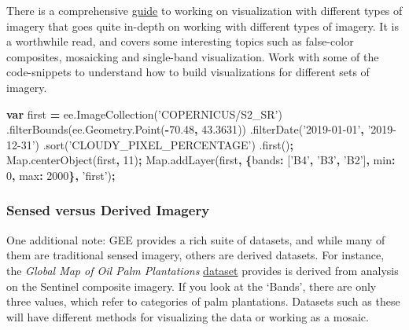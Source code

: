 \documentclass[
]{article}
\newenvironment{Shaded}{\begin{snugshade}}{\end{snugshade}}
\newcommand{\AttributeTok}[1]{\textcolor[rgb]{0.77,0.63,0.00}{#1}}
\newcommand{\DataTypeTok}[1]{\textcolor[rgb]{0.13,0.29,0.53}{#1}}
\newcommand{\DecValTok}[1]{\textcolor[rgb]{0.00,0.00,0.81}{#1}}
\newcommand{\FloatTok}[1]{\textcolor[rgb]{0.00,0.00,0.81}{#1}}
\newcommand{\KeywordTok}[1]{\textcolor[rgb]{0.13,0.29,0.53}{\textbf{#1}}}
\newcommand{\NormalTok}[1]{#1}
\newcommand{\OperatorTok}[1]{\textcolor[rgb]{0.81,0.36,0.00}{\textbf{#1}}}
\newcommand{\StringTok}[1]{\textcolor[rgb]{0.31,0.60,0.02}{#1}}
\newcommand{\VariableTok}[1]{\textcolor[rgb]{0.00,0.00,0.00}{#1}}
\begin{document}
There is a comprehensive \href{https://developers.google.com/earth-engine/guides/image_visualization}{guide} to working on visualization with different types of imagery that goes quite in-depth on working with different types of imagery. It is a worthwhile read, and covers some interesting topics such as false-color composites, mosaicking and single-band visualization. Work with some of the code-snippets to understand how to build visualizations for different sets of imagery.

\begin{Shaded}
\begin{Highlighting}[]
\KeywordTok{var}\NormalTok{ first }\OperatorTok{=} \VariableTok{ee}\NormalTok{.}\AttributeTok{ImageCollection}\NormalTok{(}\StringTok{'COPERNICUS/S2_SR'}\NormalTok{)}
\NormalTok{                .}\AttributeTok{filterBounds}\NormalTok{(}\VariableTok{ee}\NormalTok{.}\VariableTok{Geometry}\NormalTok{.}\AttributeTok{Point}\NormalTok{(}\OperatorTok{-}\FloatTok{70.48}\OperatorTok{,} \FloatTok{43.3631}\NormalTok{))}
\NormalTok{                .}\AttributeTok{filterDate}\NormalTok{(}\StringTok{'2019-01-01'}\OperatorTok{,} \StringTok{'2019-12-31'}\NormalTok{)}
\NormalTok{                .}\AttributeTok{sort}\NormalTok{(}\StringTok{'CLOUDY_PIXEL_PERCENTAGE'}\NormalTok{)}
\NormalTok{                .}\AttributeTok{first}\NormalTok{()}\OperatorTok{;}
\VariableTok{Map}\NormalTok{.}\AttributeTok{centerObject}\NormalTok{(first}\OperatorTok{,} \DecValTok{11}\NormalTok{)}\OperatorTok{;}
\VariableTok{Map}\NormalTok{.}\AttributeTok{addLayer}\NormalTok{(first}\OperatorTok{,} \OperatorTok{\{}\DataTypeTok{bands}\OperatorTok{:}\NormalTok{ [}\StringTok{'B4'}\OperatorTok{,} \StringTok{'B3'}\OperatorTok{,} \StringTok{'B2'}\NormalTok{]}\OperatorTok{,} \DataTypeTok{min}\OperatorTok{:} \DecValTok{0}\OperatorTok{,} \DataTypeTok{max}\OperatorTok{:} \DecValTok{2000}\OperatorTok{\},} \StringTok{'first'}\NormalTok{)}\OperatorTok{;}
\end{Highlighting}
\end{Shaded}

\hypertarget{sensed-versus-derived-imagery}{%
\subsubsection{Sensed versus Derived Imagery}\label{sensed-versus-derived-imagery}}

One additional note: GEE provides a rich suite of datasets, and while many of them are traditional sensed imagery, others are derived datasets. For instance, the \emph{Global Map of Oil Palm Plantations} \href{https://developers.google.com/earth-engine/datasets/catalog/BIOPAMA_GlobalOilPalm_v1}{dataset} provides is derived from analysis on the Sentinel composite imagery. If you look at the `Bands', there are only three values, which refer to categories of palm plantations. Datasets such as these will have different methods for visualizing the data or working as a mosaic.
\end{document}

